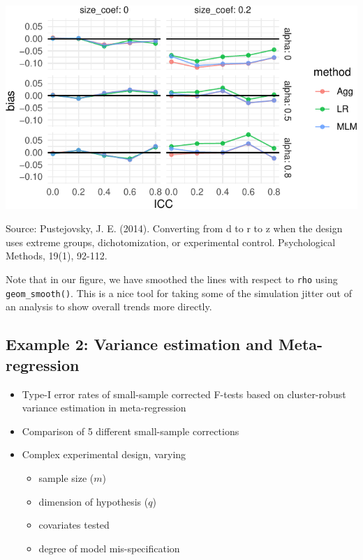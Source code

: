 \documentclass[
]{book}
\providecommand{\tightlist}{%
  \setlength{\itemsep}{0pt}\setlength{\parskip}{0pt}}
\begin{document}
\begin{center}\includegraphics[width=0.75\linewidth]{Designing-Simulations-in-R_files/figure-latex/unnamed-chunk-156-1} \end{center}

Source: Pustejovsky, J. E. (2014). Converting from d to r to z when the design uses extreme groups, dichotomization, or experimental control. Psychological Methods, 19(1), 92-112.

Note that in our figure, we have smoothed the lines with respect to \texttt{rho} using \texttt{geom\_smooth()}.
This is a nice tool for taking some of the simulation jitter out of an analysis to show overall trends more directly.

\hypertarget{example-2-variance-estimation-and-meta-regression}{%
\subsection{Example 2: Variance estimation and Meta-regression}\label{example-2-variance-estimation-and-meta-regression}}

\begin{itemize}
\tightlist
\item
  Type-I error rates of small-sample corrected F-tests based on cluster-robust variance estimation in meta-regression
\item
  Comparison of 5 different small-sample corrections
\item
  Complex experimental design, varying

  \begin{itemize}
  \tightlist
  \item
    sample size (\(m\))
  \item
    dimension of hypothesis (\(q\))
  \item
    covariates tested
  \item
    degree of model mis-specification
  \end{itemize}
\end{itemize}
\end{document}
